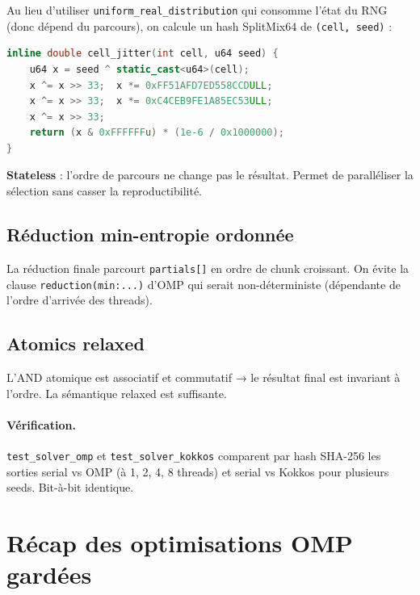 Au lieu d'utiliser \texttt{uniform\_real\_distribution} qui consomme l'état du RNG (donc dépend du parcours), on calcule un hash SplitMix64 de \texttt{(cell, seed)} :

\begin{lstlisting}[language=C++]
inline double cell_jitter(int cell, u64 seed) {
    u64 x = seed ^ static_cast<u64>(cell);
    x ^= x >> 33;  x *= 0xFF51AFD7ED558CCDULL;
    x ^= x >> 33;  x *= 0xC4CEB9FE1A85EC53ULL;
    x ^= x >> 33;
    return (x & 0xFFFFFFu) * (1e-6 / 0x1000000);
}
\end{lstlisting}

\textbf{Stateless} : l'ordre de parcours ne change pas le résultat. Permet de paralléliser la sélection sans casser la reproductibilité.

\subsection{Réduction min-entropie ordonnée}

La réduction finale parcourt \texttt{partials[]} en ordre de chunk
croissant. On évite la clause \texttt{reduction(min:...)} d'OMP qui
serait non-déterministe (dépendante de l'ordre d'arrivée des threads).

\subsection{Atomics relaxed}

L'AND atomique est associatif et commutatif → le résultat final est invariant à l'ordre. La sémantique relaxed est suffisante.

\paragraph{Vérification.} \texttt{test\_solver\_omp} et \texttt{test\_solver\_kokkos} comparent par hash SHA-256 les sorties serial vs OMP (à 1, 2, 4, 8 threads) et serial vs Kokkos pour plusieurs seeds. Bit-à-bit identique.

\section{Récap des optimisations OMP gardées}
\label{sec:omp:recap}

